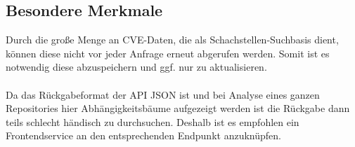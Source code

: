 \subsection{Besondere Merkmale} \label{sec:Besondere Merkmale}
Durch die große Menge an CVE-Daten, die als Schachstellen-Suchbasis dient, können diese nicht vor jeder Anfrage erneut abgerufen werden.
Somit ist es notwendig diese abzuspeichern und ggf. nur zu aktualisieren.
\\ \\
Da das Rückgabeformat der API JSON ist und bei Analyse eines ganzen Repositories hier Abhängigkeitsbäume aufgezeigt werden ist die Rückgabe dann teils schlecht händisch zu durchsuchen.
Deshalb ist es empfohlen ein Frontendservice an den entsprechenden Endpunkt anzuknüpfen.